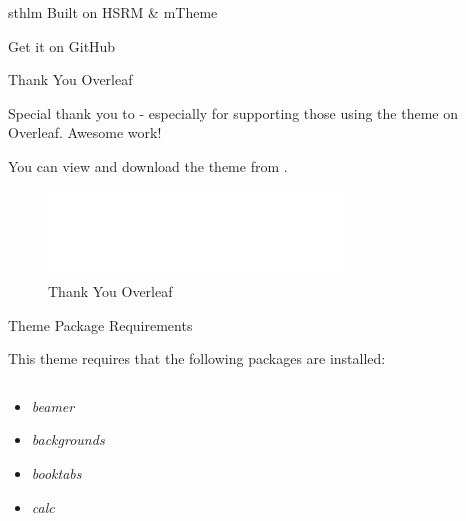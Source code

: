 \documentclass[newPxFont]{beamer}
\begin{document}
\begin{frame}[c]{sthlm Built on HSRM \& mTheme}
\begin{frame}[c]{Get it on GitHub}
\begin{center}
\end{center}
\end{frame}

\begingroup
{}
\begin{frame}{Thank You Overleaf}

Special thank you to  - especially  for supporting those using the theme on Overleaf. Awesome work!

\vspace{1em}

You can view and download the theme from .

\begin{center}
\end{center}

\begin{figure}
	\centerline{\includegraphics[width=0.7\textwidth]{overleaf.png}}
\caption{Thank You Overleaf}
\end{figure}


\end{frame}
\endgroup


\begin{frame}{Theme Package Requirements}

This theme requires that the following packages are installed:

\begin{columns}[t]
\begin{column}{0.5\textwidth}
\begin{itemize}
\item \emph{beamer}
\item \emph{backgrounds}
\item \emph{booktabs}
\item \emph{calc}
\end{itemize}
\end{column}


\end{columns}
\end{frame}
\end{frame}
\end{document}
